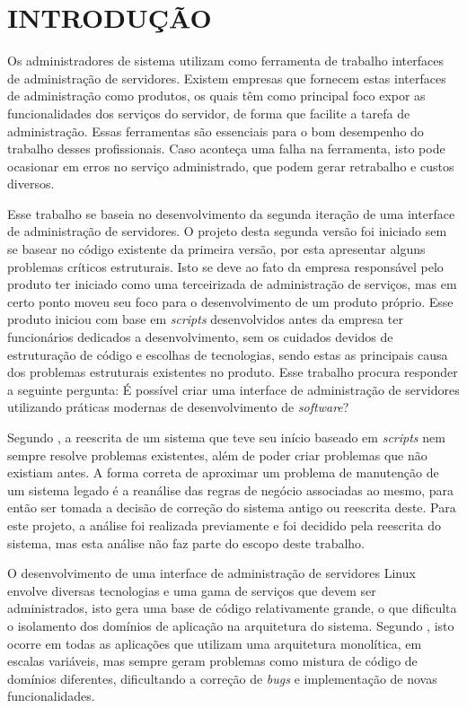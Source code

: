 \chapter{INTRODUÇÃO}
\label{chp:intro}

Os administradores de sistema utilizam como ferramenta de trabalho interfaces
de administração de servidores. Existem empresas que fornecem estas interfaces
de administração como produtos, os quais têm como principal foco expor as
funcionalidades dos serviços do servidor, de forma que facilite a tarefa de
administração. Essas ferramentas são essenciais para o bom desempenho do
trabalho desses profissionais. Caso aconteça uma falha na ferramenta, isto
pode ocasionar em erros no serviço administrado, que podem gerar retrabalho
e custos diversos.

Esse trabalho se baseia no desenvolvimento da segunda iteração de uma
interface de administração de servidores. O projeto desta segunda versão
foi iniciado sem se basear no código existente da primeira versão, por esta
apresentar alguns problemas críticos estruturais. Isto se deve ao fato da
empresa responsável pelo produto ter iniciado como uma terceirizada de
administração de serviços, mas em certo ponto moveu seu foco para o
desenvolvimento de um produto próprio. Esse produto iniciou com base em
\emph{scripts} desenvolvidos antes da empresa ter funcionários dedicados a
desenvolvimento, sem os cuidados devidos de estruturação de código e escolhas
de tecnologias, sendo estas as principais causa dos problemas estruturais
existentes no produto. Esse trabalho procura responder a seguinte pergunta:
É possível criar uma interface de administração de servidores utilizando
práticas modernas de desenvolvimento de \emph{software}?

Segundo , a reescrita de um sistema que teve seu
início baseado em \emph{scripts} nem sempre resolve problemas existentes,
além de poder criar problemas que não existiam antes. A forma correta de
aproximar um problema de manutenção de um sistema legado é a reanálise das
regras de negócio associadas ao mesmo, para então ser tomada a decisão de
correção do sistema antigo ou reescrita deste. Para este projeto, a análise
foi realizada previamente e foi decidido pela reescrita do sistema, mas esta
análise não faz parte do escopo deste trabalho.

O desenvolvimento de uma interface de administração de servidores Linux
envolve diversas tecnologias e uma gama de serviços que devem ser
administrados, isto gera uma base de código relativamente grande, o que
dificulta o isolamento dos domínios de aplicação na arquitetura
do sistema. Segundo , isto ocorre em todas as aplicações
que utilizam uma arquitetura monolítica, em escalas variáveis, mas sempre
geram problemas como mistura de código de domínios diferentes, dificultando
a correção de \emph{bugs} e implementação de novas funcionalidades.

